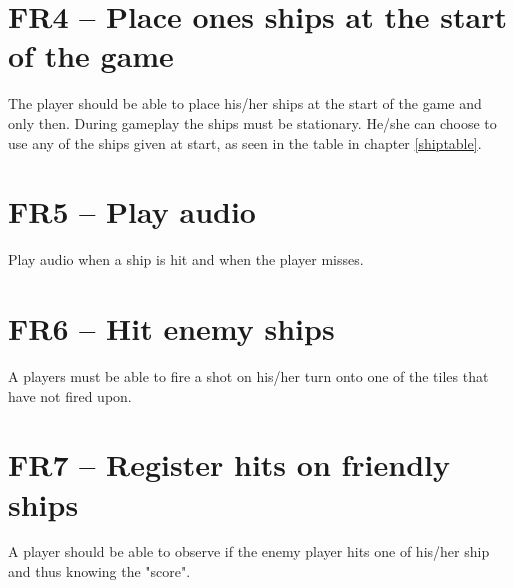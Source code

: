 \section{FR4 – Place ones ships at the start of the game}
The player should be able to place his/her ships at the start of the game and only then. During gameplay the ships must be stationary. He/she can choose to use any of the ships given at start, as seen in the table in chapter \ref{shiptable}.

\section{FR5 – Play audio}
Play audio when a ship is hit and when the player misses.


\section{FR6 – Hit enemy ships}
A players must be able to fire a shot on his/her turn onto one of the tiles that have not fired upon.

\section{FR7 – Register hits on friendly ships}
A player should be able to observe if the enemy player hits one of his/her ship and thus knowing the "score".
